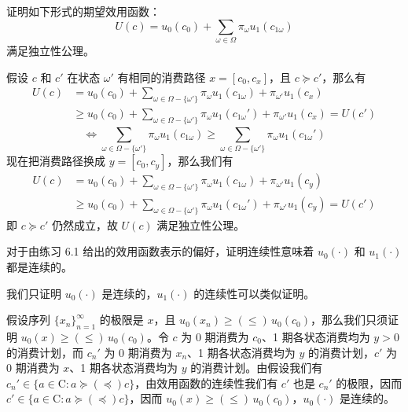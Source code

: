 
\begin{problem}
 证明如下形式的期望效用函数：
\[
    U(c)=u_{0}(c_{0})+\sum_{\omega\in\Omega}\pi_{\omega}u_{1}(c_{1\omega})
\]
满足独立性公理。
\end{problem}
\begin{solution}
假设 $c$ 和 $c'$ 在状态 $\omega'$ 有相同的消费路径 $x=[c_{0},c_{x}]$，且 $c\succeq c'$，那么有
\[
    \begin{aligned}
        U(c)
        &=u_{0}(c_{0})+\sum_{\omega\in\Omega-\{\omega'\}}\pi_{\omega}u_{1}(c_{1\omega})+\pi_{\omega'}u_{1}(c_{x})\\
        &\ge u_{0}(c_{0})+\sum_{\omega\in\Omega-\{\omega'\}}\pi_{\omega}u_{1}(c_{1\omega}')+\pi_{\omega'}u_{1}(c_{x})=U(c')
    \end{aligned}
\]
\[
    \Leftrightarrow\sum_{\omega\in\Omega-\{\omega'\}}\pi_{\omega}u_{1}(c_{1\omega})\ge\sum_{\omega\in\Omega-\{\omega'\}}\pi_{\omega}u_{1}(c_{1\omega}')
\]
现在把消费路径换成 $y=[c_{0},c_{y}]$，那么我们有
\[
    \begin{aligned}
        U(c)
        &=u_{0}(c_{0})+\sum_{\omega\in\Omega-\{\omega'\}}\pi_{\omega}u_{1}(c_{1\omega})+\pi_{\omega'}u_{1}(c_{y})\\
        &\ge u_{0}(c_{0})+\sum_{\omega\in\Omega-\{\omega'\}}\pi_{\omega}u_{1}(c_{1\omega}')+\pi_{\omega'}u_{1}(c_{y})=U(c')
    \end{aligned}
\]
即 $c\succeq c'$ 仍然成立，故 $U(c)$ 满足独立性公理。
\end{solution}

\begin{problem}
 对于由练习 6.1 给出的效用函数表示的偏好，证明连续性意味着 $u_{0}(\cdot)$ 和 $u_{1}(\cdot)$ 都是连续的。
\end{problem}
\begin{solution}
我们只证明 $u_{0}(\cdot)$ 是连续的，$u_{1}(\cdot)$ 的连续性可以类似证明。

假设序列 $\{x_{n}\}_{n=1}^{\infty}$ 的极限是 $x$，且 $u_{0}(x_{n})\ge(\le)\,u_{0}(c_{0})$，那么我们只须证明 $u_{0}(x)\ge(\le)\,u_{0}(c_{0})$。令 $c$ 为 0 期消费为 $c_{0}$、1 期各状态消费均为 $y>0$ 的消费计划，而 $c_{n}'$ 为 0 期消费为 $x_{n}$、1 期各状态消费均为 $y$ 的消费计划，$c'$ 为 0 期消费为 $x$、1 期各状态消费均为 $y$ 的消费计划。由假设我们有 $c_{n}'\in\{a\in\mathrm{C}:a\succeq(\preceq)c\}$，由效用函数的连续性我们有 $c'$ 也是 $c_{n}'$ 的极限，因而 $c'\in\{a\in\mathrm{C}:a\succeq(\preceq)c\}$，因而 $u_{0}(x)\ge(\le)\,u_{0}(c_{0})$，$u_{0}(\cdot)$ 是连续的。
\end{solution}

